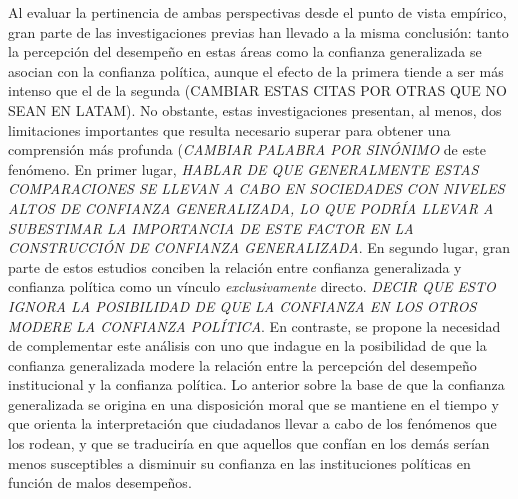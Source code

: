 \documentclass[12pt,twoside]{templates/facsothesis}
\begin{document}
Al evaluar la pertinencia de ambas perspectivas desde el punto de vista empírico, gran parte de las investigaciones previas han llevado a la misma conclusión: tanto la percepción del desempeño en estas áreas como la confianza generalizada se asocian con la confianza política, aunque el efecto de la primera tiende a ser más intenso que el de la segunda \citep{mainwaringStateDeficienciesParty2006, mattesSocialPoliticalTrust2018, morrisCorruptionTrustTheoretical2010, newtonSocialPoliticalTrust2017} (CAMBIAR ESTAS CITAS POR OTRAS QUE NO SEAN EN LATAM). No obstante, estas investigaciones presentan, al menos, dos limitaciones importantes que resulta necesario superar para obtener una comprensión más profunda (\emph{CAMBIAR PALABRA POR SINÓNIMO} de este fenómeno. En primer lugar, \emph{HABLAR DE QUE GENERALMENTE ESTAS COMPARACIONES SE LLEVAN A CABO EN SOCIEDADES CON NIVELES ALTOS DE CONFIANZA GENERALIZADA, LO QUE PODRÍA LLEVAR A SUBESTIMAR LA IMPORTANCIA DE ESTE FACTOR EN LA CONSTRUCCIÓN DE CONFIANZA GENERALIZADA}. En segundo lugar, gran parte de estos estudios conciben la relación entre confianza generalizada y confianza política como un vínculo \emph{exclusivamente} directo. \emph{DECIR QUE ESTO IGNORA LA POSIBILIDAD DE QUE LA CONFIANZA EN LOS OTROS MODERE LA CONFIANZA POLÍTICA}. En contraste, se propone la necesidad de complementar este análisis con uno que indague en la posibilidad de que la confianza generalizada modere la relación entre la percepción del desempeño institucional y la confianza política. Lo anterior sobre la base de que la confianza generalizada se origina en una disposición moral que se mantiene en el tiempo y que orienta la interpretación que ciudadanos llevar a cabo de los fenómenos que los rodean, y que se traduciría en que aquellos que confían en los demás serían menos susceptibles a disminuir su confianza en las instituciones políticas en función de malos desempeños.
\end{document}
